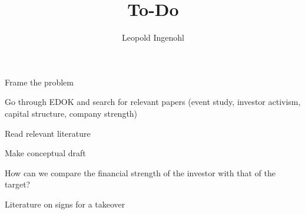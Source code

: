 \documentclass{article}
\title{To-Do}
\author{Leopold Ingenohl}
\newcommand{\cmark}{\ding{51}}%
\newcommand{\done}{\rlap{$\square$}{\raisebox{2pt}{\large\hspace{1pt}\cmark}}%
\hspace{-2.5pt}}
\begin{document}
\maketitle


  \begin{todolist}
  \item[\done] Frame the problem
  \end{todolist}

\begin{todolist}
  \item Go through EDOK and search for relevant papers (event study, investor activism, capital structure, company strength)
  \item Read relevant literature
  \item Make conceptual draft 
  \item How can we compare the financial strength of the investor with that of the target?
  \item Literature on signs for a takeover 
\end{todolist}
\end{document}
